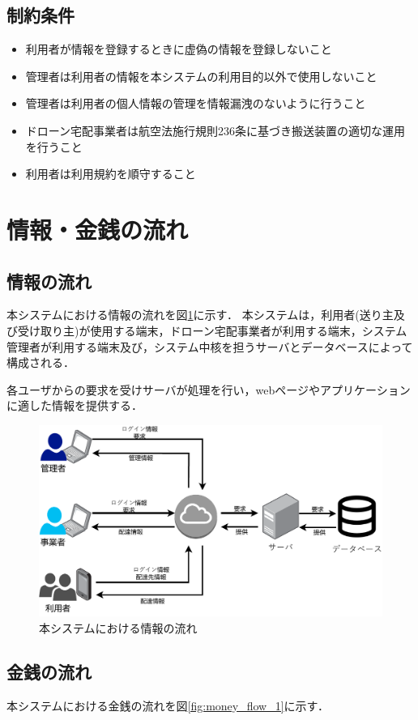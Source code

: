 \documentclass[a4paper, titlepage]{jsarticle}
\begin{document}
\subsection{制約条件}
\begin{itemize}
        \item 利用者が情報を登録するときに虚偽の情報を登録しないこと
        \item 管理者は利用者の情報を本システムの利用目的以外で使用しないこと
        \item 管理者は利用者の個人情報の管理を情報漏洩のないように行うこと
        \item ドローン宅配事業者は航空法施行規則236条に基づき搬送装置の適切な運用を行うこと
        \item 利用者は利用規約を順守すること
\end{itemize}
\section{情報・金銭の流れ}

\subsection{情報の流れ}
本システムにおける情報の流れを図\ref{fig:info_flow_1}に示す．
本システムは，利用者(送り主及び受け取り主)が使用する端末，ドローン宅配事業者が利用する端末，システム管理者が利用する端末及び，システム中核を担うサーバとデータベースによって構成される．

各ユーザからの要求を受けサーバが処理を行い，webページやアプリケーションに適した情報を提供する．

\begin{figure}[H]
        \centering
        \includegraphics[width=0.6\linewidth]{./info_flow.pdf}
        \caption{本システムにおける情報の流れ}
        \label{fig:info_flow_1}
\end{figure}

\subsection{金銭の流れ}
本システムにおける金銭の流れを図\ref{fig:money_flow_1}に示す．
\end{document}
